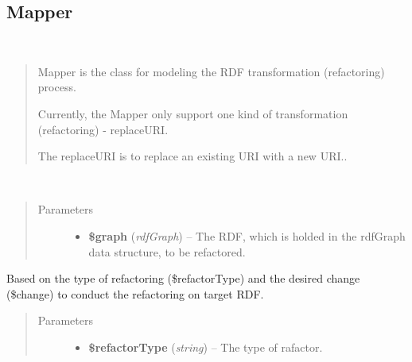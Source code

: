 \documentclass[letterpaper,10pt,english]{sphinxmanual}
\begin{document}
\subsection{Mapper}
\label{docs/api:mapper}

\begin{fulllineitems}
\label{docs/api:Mapper}~\begin{quote}

Mapper is the class for modeling the RDF transformation (refactoring) process.

Currently, the Mapper only support one kind of
transformation (refactoring) - replaceURI.

The replaceURI is to replace an existing URI
with a new URI..
\end{quote}

\begin{fulllineitems}
\label{docs/api:Mapper::Mapper}~\begin{quote}\begin{description}
\item[{Parameters}] \leavevmode\begin{itemize}
\item {} 
\textbf{\$graph} (\emph{rdfGraph}) -- The RDF, which is holded in the rdfGraph data structure, to be refactored.

\end{itemize}

\end{description}\end{quote}

\end{fulllineitems}


\begin{fulllineitems}
\label{docs/api:Mapper::refactoring}
Based on the type of refactoring (\$refactorType) and the desired change (\$change) to conduct the refactoring on target RDF.
\begin{quote}\begin{description}
\item[{Parameters}] \leavevmode\begin{itemize}
\item {} 
\textbf{\$refactorType} (\emph{string}) -- The type of rafactor.


\end{itemize}
\end{description}
\end{quote}
\end{fulllineitems}
\end{fulllineitems}
\end{document}
